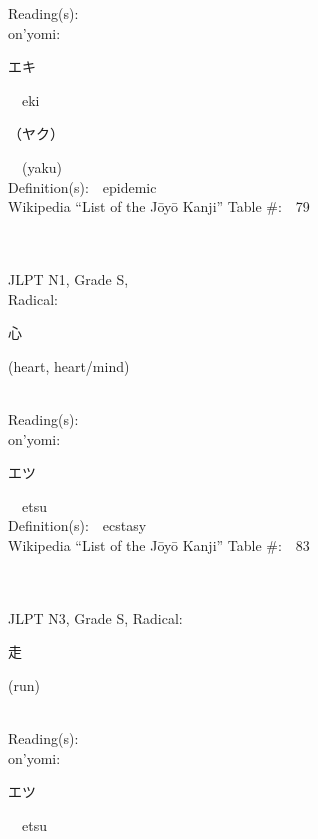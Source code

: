 \begin{multicols}{2}
Reading(s):\ \ \\
{\hspace*{1em}}on'yomi:\ \ \\
{\hspace*{2em}}{\begin{CJK}{UTF8}{min} エキ \end{CJK}}\ \ eki\ \ \\
{\hspace*{2em}}{\begin{CJK}{UTF8}{min} （ヤク） \end{CJK}}\ \ (yaku)\ \ \\
Definition(s):\ \ epidemic \\
Wikipedia ``List of the J\=oy\=o Kanji'' Table \#:\ \ 79 \\
\ \ \\
{\fontsize{34pt}{40pt}  }\ \ \\
{JLPT N1, Grade S, \\Radical:\ \ {\begin{CJK}{UTF8}{min} 心 \end{CJK}} (heart, heart/mind) } \\
Reading(s):\ \ \\
{\hspace*{1em}}on'yomi:\ \ \\
{\hspace*{2em}}{\begin{CJK}{UTF8}{min} エツ \end{CJK}}\ \ etsu\ \ \\
Definition(s):\ \ ecstasy \\
Wikipedia ``List of the J\=oy\=o Kanji'' Table \#:\ \ 83 \\
\ \ \\
{\fontsize{34pt}{40pt}  }\ \ \\  %
{JLPT N3, Grade S, Radical:\ \ {\begin{CJK}{UTF8}{min} 走 \end{CJK}} (run) } \\
Reading(s):\ \ \\
{\hspace*{1em}}on'yomi:\ \ \\
{\hspace*{2em}}{\begin{CJK}{UTF8}{min} エツ \end{CJK}}\ \ etsu\ \ \\

\end{multicols}
